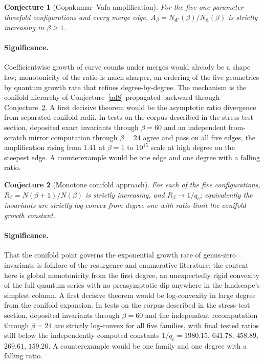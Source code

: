 \documentclass[11pt]{article}
\newtheorem{conjecture}{Conjecture}
\theoremstyle{definition}
\begin{document}
\begin{conjecture}[Gopakumar--Vafa amplification]\label{ad6}
For the five one-parameter threefold configurations and every merge edge, $A_\beta=N_{\mathbf d'}(\beta)/N_{\mathbf d}(\beta)$ is strictly increasing in $\beta\ge1$.
\end{conjecture}

\paragraph{Significance.}
Coefficientwise growth of curve counts under merges would already be a shape law; monotonicity of the ratio is much sharper, an ordering of the five geometries by quantum growth rate that refines degree-by-degree.  The mechanism is the conifold hierarchy of Conjecture~\ref{ad8} propagated backward through Conjecture~\ref{ad7}.  A first decisive theorem would be the asymptotic ratio divergence from separated conifold radii.  In tests on the corpus described in the stress-test section, deposited exact invariants through $\beta=60$ and an independent from-scratch mirror computation through $\beta=24$ agree and pass on all five edges, the amplification rising from $1.41$ at $\beta=1$ to $10^{15}$ scale at high degree on the steepest edge.  A counterexample would be one edge and one degree with a falling ratio.

\begin{conjecture}[Monotone conifold approach]\label{ad7}
For each of the five configurations, $R_\beta=N(\beta+1)/N(\beta)$ is strictly increasing, and $R_\beta\to1/q_c$; equivalently the invariants are strictly log-convex from degree one with ratio limit the conifold growth constant.
\end{conjecture}

\paragraph{Significance.}
That the conifold point governs the exponential growth rate of genus-zero invariants is folklore of the resurgence and enumerative literature; the content here is global monotonicity from the first degree, an unexpectedly rigid convexity of the full quantum series with no preasymptotic dip anywhere in the landscape's simplest column.  A first decisive theorem would be log-convexity in large degree from the conifold expansion.  In tests on the corpus described in the stress-test section, deposited invariants through $\beta=60$ and the independent recomputation through $\beta=24$ are strictly log-convex for all five families, with final tested ratios still below the independently computed constants $1/q_c=1980.15$, $641.78$, $458.89$, $269.61$, $159.26$.  A counterexample would be one family and one degree with a falling ratio.
\end{document}
